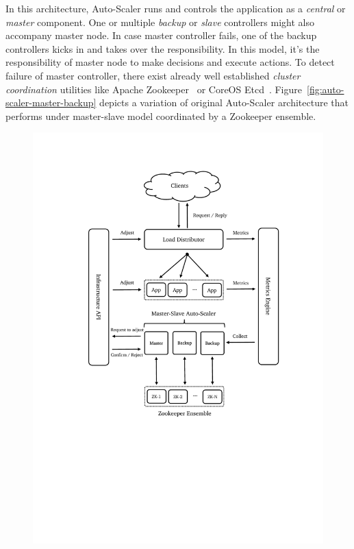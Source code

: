 \begin{description}[leftmargin=0pt]
    \item[Global Controller] In this architecture, Auto-Scaler runs and controls the application as a \emph{central} or \emph{master} component. One or multiple \emph{backup} or \emph{slave} controllers might also accompany master node. In case master controller fails, one of the backup controllers kicks in and takes over the responsibility. In this model, it's the responsibility of master node to make decisions and execute actions. To detect failure of master controller, there exist already well established \emph{cluster coordination} utilities like Apache Zookeeper~\cite{zk} or CoreOS Etcd~\cite{etcd}. Figure~\ref{fig:auto-scaler-master-backup} depicts a variation of original Auto-Scaler architecture that performs under master-slave model coordinated by a Zookeeper ensemble.
    \begin{figure}[hb]
        \includegraphics[clip, trim=3cm 9cm 2.5cm 2.5cm]{auto-scaler-master-backup.pdf}

\end{figure}
\end{description}
